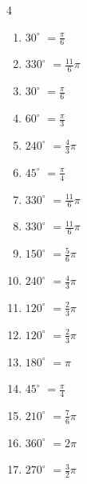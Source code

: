 \begin{multicols}{4}
\begin{enumerate}
  \item $\displaystyle 30^{\circ}$
        $\displaystyle =\frac{\pi}{6}$

  \item $\displaystyle 330^{\circ}$
        $\displaystyle =\frac{11}{6}\pi$

  \item $\displaystyle 30^{\circ}$
        $\displaystyle =\frac{\pi}{6}$

  \item $\displaystyle 60^{\circ}$
        $\displaystyle =\frac{\pi}{3}$

  \item $\displaystyle 240^{\circ}$
        $\displaystyle =\frac{4}{3}\pi$

  \item $\displaystyle 45^{\circ}$
        $\displaystyle =\frac{\pi}{4}$

  \item $\displaystyle 330^{\circ}$
        $\displaystyle =\frac{11}{6}\pi$

  \item $\displaystyle 330^{\circ}$
        $\displaystyle =\frac{11}{6}\pi$

  \item $\displaystyle 150^{\circ}$
        $\displaystyle =\frac{5}{6}\pi$

  \item $\displaystyle 240^{\circ}$
        $\displaystyle =\frac{4}{3}\pi$

  \item $\displaystyle 120^{\circ}$
        $\displaystyle =\frac{2}{3}\pi$

  \item $\displaystyle 120^{\circ}$
        $\displaystyle =\frac{2}{3}\pi$

  \item $\displaystyle 180^{\circ}$
        $\displaystyle =\pi$

  \item $\displaystyle 45^{\circ}$
        $\displaystyle =\frac{\pi}{4}$

  \item $\displaystyle 210^{\circ}$
        $\displaystyle =\frac{7}{6}\pi$

  \item $\displaystyle 360^{\circ}$
        $\displaystyle =2\pi$

  \item $\displaystyle 270^{\circ}$
        $\displaystyle =\frac{3}{2}\pi$


\end{enumerate}
\end{multicols}
